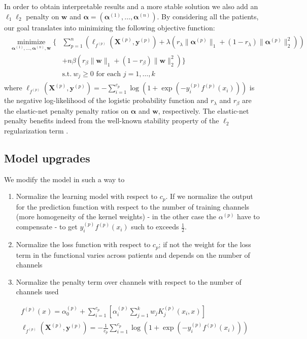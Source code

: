 \documentclass[a4paper]{article}
\DeclareMathOperator{\minimize}{minimize}
\begin{document}
In order to obtain interpretable results and a more stable solution we also add an $\ell_1\ell_2$ penalty on $\bm{w}$ and $\bm \alpha=(\bm{\alpha}^{(1)}, \dots, \bm{\alpha}^{(n)})$.
%
By considering all the patients, our goal translates into minimizing the following objective function:
\begin{align}\label{eq:mkl-multipatient}\begin{split}
\underset{\bm{\alpha}^{(1)}, \dots, \bm{\alpha}^{(n)}, \bm{w}}{\minimize}
\bigg\{& \sum_{p=1}^n  \left( \ell_{f^{(p)}} \left(\bm{X}^{(p)}, \bm{y}^{(p)}\right) + \lambda  (r_\lambda \|\bm{\alpha}^{(p)}\|_1+(1-r_\lambda)\|\bm{\alpha}^{(p)}\|_2^2) \right)\\
& + n\beta \left(r_\beta \|\bm{w}\|_1 + (1-r_\beta)\|\bm{w}\|^2_2\right) \bigg\}\\
& \text{s.t.}\ w_j \geq 0 \text{ for each } j=1,\dots,k
\end{split}\end{align}
%
where $\ell_{f^{(p)}}\left(\bm{X}^{(p)}, \bm{y}^{(p)}\right) = -\sum_{i=1}^{c_p}\log(1 + \exp(-y_i^{(p)}f^{(p)}(x_i)))$ is the negative log-likelihood of the logistic probability function and $r_\lambda$ and $r_\beta$ are the elastic-net penalty penalty ratios on
 $\bm{\alpha}$ and $\bm{w}$, respectively.
The elastic-net penalty benefits indeed from the well-known stability property of the $\ell_2$ regularization term \cite{zou2005regularization}.

\subsection{Model upgrades}
We modify the model in such a way to
\begin{enumerate}
  \item Normalize the learning model with respect to $c_p$. If we normalize the output for the prediction function with respect to the number of training channels (more homogeneity of the kernel weights) - in the other case the $\alpha^{(p)}$ have to compensate - to get $y_i^{(p)} f^{(p)}(x_i)$ such to exceeds $\frac12$.
  \item Normalize the loss function with respect to $c_p$; if not the weight for the loss term in the functional varies across patients and depends on the number of channels
  \item Normalize the penalty term over channels with respect to the number of channels used
\end{enumerate}
\begin{align}
  & f^{(p)}(x) = \alpha^{(p)}_0 + \sum_{i = 1}^{c_p}\left[\alpha^{(p)}_i \sum_{j=1}^{k} w_j K^{(p)}_j(x_i, x)\right] \\
  &\ell_{f^{(p)}}\left(\bm{X}^{(p)}, \bm{y}^{(p)}\right) = -\frac{1}{c_p}\sum_{i=1}^{c_p}\log\left(1 + \exp\left(-y_i^{(p)}f^{(p)}(x_i)\right)\right)
\end{align}
\end{document}
